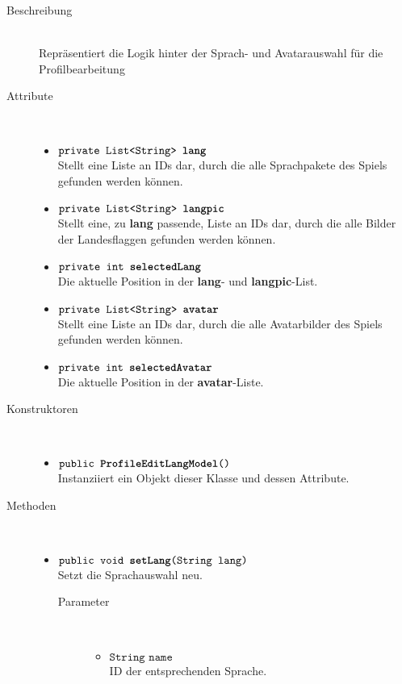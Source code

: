 \begin{description}
\item[Beschreibung] \hfill \\ Repräsentiert die Logik hinter der Sprach- und Avatarauswahl für die Profilbearbeitung

\item[Attribute] \hfill \\
	\vspace{-.8cm}
	\begin{itemize}
		\item $\texttt{private List<String> \textbf{lang}}$ \\ Stellt eine Liste an IDs dar, durch die alle Sprachpakete des Spiels gefunden werden können.
		\item $\texttt{private List<String> \textbf{langpic}}$ \\ Stellt eine, zu \textbf{lang} passende, Liste an IDs dar, durch die alle Bilder der Landesflaggen gefunden werden können.
		\item $\texttt{private int \textbf{selectedLang}}$ \\ Die aktuelle Position in der \textbf{lang}- und  \textbf{langpic}-List.
		\item $\texttt{private List<String> \textbf{avatar}}$ \\ Stellt eine Liste an IDs dar, durch die alle Avatarbilder des Spiels gefunden werden können.
		\item $\texttt{private int \textbf{selectedAvatar}}$ \\ Die aktuelle Position in der \textbf{avatar}-Liste.
	\end{itemize}
	
\item[Konstruktoren] \hfill \\
	\vspace{-.8cm}
	\begin{itemize}
		\item $\texttt{public \textbf{ProfileEditLangModel}()}$ \\ Instanziiert ein Objekt dieser Klasse und dessen Attribute.
	\end{itemize}
	
\item[Methoden] \hfill \\
	\vspace{-.8cm}
	\begin{itemize}		
		\item $\texttt{public void \textbf{setLang}(String lang)}$ \\ Setzt die Sprachauswahl neu.
		\begin{description}
			\item[Parameter] \hfill \\
			\vspace{-.8cm}
			\begin{itemize}
				\item $\texttt{String name}$ \\ ID der entsprechenden Sprache.
			\end{itemize}
		\end{description}
		

\end{itemize}
\end{description}
